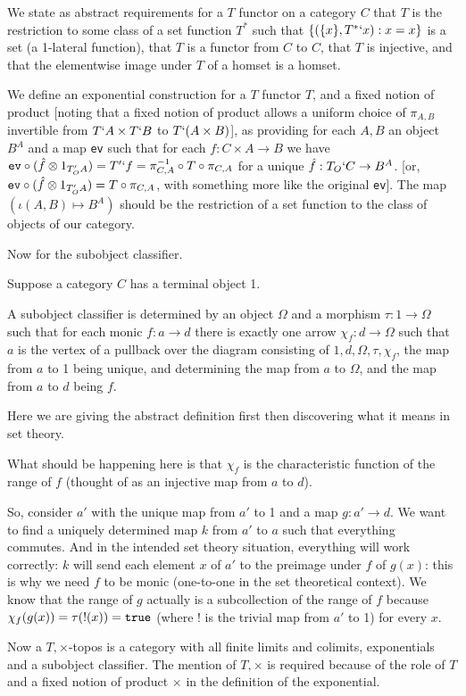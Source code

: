 \documentclass[12pt]{article}
\begin{document}
We state as abstract requirements for a $T$ functor on a category $C$ that $T$ is the restriction to some class of a set function $T^*$ such that $\{(\{x\},T^*`x):x=x\}$ is a set (a 1-lateral function), that $T$ is a functor from $C$ to $C$, that $T$ is injective, and that the elementwise image under $T$ of a homset is a homset.

We define an exponential construction for a $T$ functor $T$, and a fixed notion of product  [noting that a  fixed notion of product allows a uniform choice of $\pi_{A,B}$ invertible from $T`A \times T`B$ to $T`(A \times B)$], as providing for each $A,B$ an object $B^A$ and a map {\tt ev} such that 
 for each $f:C \times A \rightarrow B$ we have ${\tt ev}\circ (\hat f \otimes 1_{T_O'A}) = T'`f = \pi_{C,A}^{-1}\circ T \circ \pi_{C,A}$ for a unique $\hat f:T_O`C \rightarrow B^A$.  
[or,  ${\tt ev}\circ (\hat f \otimes 1_{T_O'A}) =  T \circ \pi_{C,A}$, with something more like the original {\tt ev}].
The map $(\iota(A,B) \mapsto B^A)$ should be the restriction of a set function to the class of objects of our category.


Now for the subobject classifier.

Suppose a category $C$ has a terminal object 1.

A subobject classifier is determined by an object $\Omega$ and a morphism $\tau:1 \rightarrow \Omega$ such that for each monic $f:a \rightarrow d$ there is exactly one arrow $\chi_f:d \rightarrow \Omega$
such that $a$ is the vertex of a pullback over the diagram consisting of $1,d,\Omega,\tau, \chi_f$, the map from $a$ to 1 being unique, and determining the map from $a$ to $\Omega$, and the map from $a$ to $d$ being $f$.


Here we are giving the abstract definition first then discovering what it means in set theory.

What should be happening here is that $\chi_f$ is the characteristic function of the range of $f$ (thought of as an injective map from $a$ to $d$).

So, consider $a'$ with the unique map from $a'$ to 1 and a map $g: a' \rightarrow d$.  We want to find a uniquely determined map $k$ from $a'$ to $a$ such that everything commutes.
And in the intended set theory situation, everything will work correctly:  $k$ will send each element $x$ of $a'$ to the preimage under $f$ of $g(x)$:  this is why we need
$f$ to be monic (one-to-one in the set theoretical context).  We know that the range of $g$ actually is a subcollection of the range of $f$ because
$\chi_f(g(x)) = \tau(!(x)) = {\tt true}$ (where ! is the trivial map from $a'$ to 1) for every $x$.

Now a $T,\times$-topos is a category with all finite limits and colimits, exponentials and a subobject classifier.  The mention of $T,\times$ is required because of the role of $T$ and a fixed notion of product $\times$ in the definition of the exponential.
\end{document}
